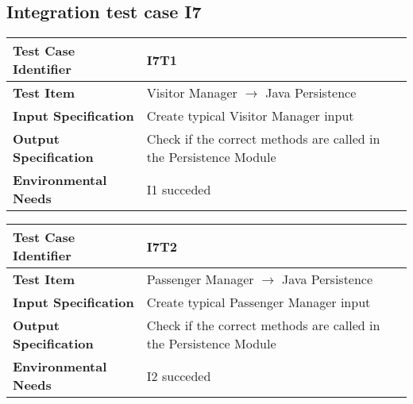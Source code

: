 \subsection{Integration test case I7}

\begin{table}[!htbp]
\begin{center}
\begin{tabular}[t]{p{}|p{}}

\hline
\textbf{Test Case Identifier} & I7T1 \\
\hline
\textbf{Test Item} & Visitor Manager $\rightarrow$ Java Persistence \\
\hline
\textbf{Input Specification} & Create typical Visitor Manager input  \\
\hline
\textbf{Output Specification} & Check if the correct methods are called in the Persistence Module \\
\hline
\textbf{Environmental Needs} & I1 succeded \\
\hline

\end{tabular}
\end{center}
\end{table}

\begin{table}[!htbp]
\begin{center}
\begin{tabular}[t]{p{}|p{}}

\hline
\textbf{Test Case Identifier} & I7T2 \\
\hline
\textbf{Test Item} & Passenger Manager $\rightarrow$ Java Persistence \\
\hline
\textbf{Input Specification} & Create typical Passenger Manager input \\
\hline
\textbf{Output Specification} & Check if the correct methods are called in the Persistence Module \\
\hline
\textbf{Environmental Needs} & I2 succeded \\
\hline

\end{tabular}
\end{center}
\end{table}

